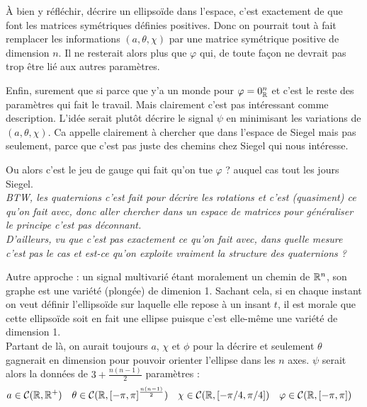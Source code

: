 \`A bien y réfléchir, décrire un ellipsoïde dans l'espace, c'est exactement de que font les matrices symétriques définies positives. Donc on pourrait tout à fait remplacer les informations $(a,\theta,\chi)$ par une matrice symétrique positive de dimension $n$. Il ne resterait alors plus que $\varphi$ qui, de toute façon ne devrait pas trop être lié aux autres paramètres.

Enfin, surement que si parce que y'a un monde pour $\varphi=0_{\mathbb{R}}^n$ et c'est le reste des paramètres qui fait le travail. Mais clairement c'est pas intéressant comme description. L'idée serait plutôt décrire le signal $\psi$ en minimisant les variations de $(a,\theta,\chi)$.
Ca appelle clairement à chercher que dans l'espace de Siegel mais pas seulement, parce que c'est pas juste des chemins chez Siegel qui nous intéresse.

Ou alors c'est le jeu de gauge qui fait qu'on tue $\varphi$ ? auquel cas tout les jours Siegel.
\\

\textit{BTW, les quaternions c'est fait pour décrire les rotations et c'est (quasiment) ce qu'on fait avec, donc aller chercher dans un espace de matrices pour généraliser le principe c'est pas déconnant.}
\\
\textit{D'ailleurs, vu que c'est pas exactement ce qu'on fait avec, dans quelle mesure c'est pas le cas et est-ce qu'on exploite vraiment la structure des quaternions ?}


\begin{proposition}\label{prop:gene_param_signal_v2}
Autre approche : un signal multivarié étant moralement un chemin de $\mathbb{R}^n$, son graphe est une variété (plongée) de dimenion 1. Sachant cela, si en chaque instant on veut définir l'ellipsoïde sur laquelle elle repose à un insant $t$, il est morale que cette ellipsoïde soit en fait une ellipse puisque c'est elle-même une variété de dimension 1.
\\
Partant de là, on aurait toujours $a$, $\chi$ et $\phi$ pour la décrire et seulement $\theta$ gagnerait en dimension pour pouvoir orienter l'ellipse dans les $n$ axes. $\psi$ serait alors la données de $3+\frac{n(n-1)}{2}$ paramètres :
\begin{align*}
	a&\in\mathcal{C}(\mathbb{R},\mathbb{R}^+)  &  \theta&\in\mathcal{C}(\mathbb{R}, [-\pi,\pi]^{\frac{n(n-1)}{2}})  &  \chi&\in\mathcal{C}(\mathbb{R}, [-\pi/4,\pi/4])  &  \varphi&\in\mathcal{C}(\mathbb{R}, [-\pi,\pi])
\end{align*}
\end{proposition}

